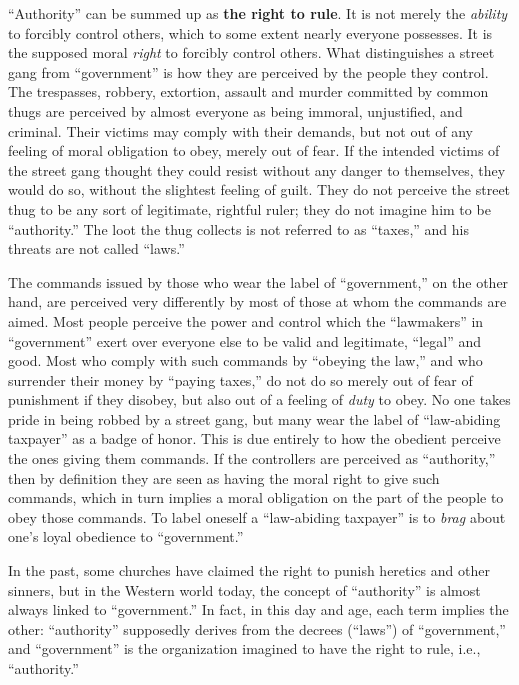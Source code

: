\documentclass{book}
\begin{document}
\enquote{Authority} can be summed up as \textbf{the right to rule}. It is not merely the \emph{ability} to forcibly control others, which to some extent nearly everyone possesses. It is the supposed moral \emph{right} to forcibly control others. What distinguishes a street gang from \enquote{government} is how they are perceived by the people they control. The trespasses, robbery, extortion, assault and murder committed by common thugs are perceived by almost everyone as being immoral, unjustified, and criminal. Their victims may comply with their demands, but not out of any feeling of moral obligation to obey, merely out of fear. If the intended victims of the street gang thought they could resist without any danger to themselves, they would do so, without the slightest feeling of guilt. They do not perceive the street thug to be any sort of legitimate, rightful ruler; they do not imagine him to be \enquote{authority.} The loot the thug collects is not referred to as \enquote{taxes,} and his threats are not called \enquote{laws.}

The commands issued by those who wear the label of \enquote{government,} on the other hand, are perceived very differently by most of those at whom the commands are aimed. Most people perceive the power and control which the \enquote{lawmakers} in \enquote{government} exert over everyone else to be valid and legitimate, \enquote{legal} and good. Most who comply with such commands by \enquote{obeying the law,} and who surrender their money by \enquote{paying taxes,} do not do so merely out of fear of punishment if they disobey, but also out of a feeling of \emph{duty} to obey. No one takes pride in being robbed by a street gang, but many wear the label of \enquote{law-abiding taxpayer} as a badge of honor. This is due entirely to how the obedient perceive the ones giving them commands. If the controllers are perceived as \enquote{authority,} then by definition they are seen as having the moral right to give such commands, which in turn implies a moral obligation on the part of the people to obey those commands. To label oneself a \enquote{law-abiding taxpayer} is to \emph{brag} about one's loyal obedience to \enquote{government.}

In the past, some churches have claimed the right to punish heretics and other sinners, but in the Western world today, the concept of \enquote{authority} is almost always linked to \enquote{government.} In fact, in this day and age, each term implies the other: \enquote{authority} supposedly derives from the decrees (\enquote{laws}) of \enquote{government,} and \enquote{government} is the organization imagined to have the right to rule, i.e., \enquote{authority.}
\end{document}
